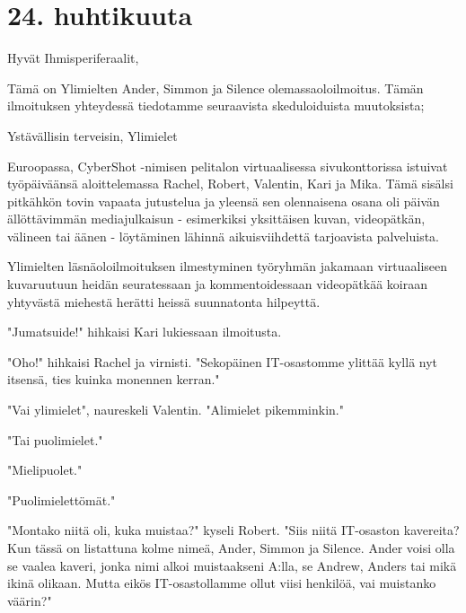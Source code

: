 \chapter{24. huhtikuuta}Hyvät Ihmisperiferaalit,


Tämä on Ylimielten Ander, Simmon ja Silence olemassaoloilmoitus. Tämän ilmoituksen yhteydessä tiedotamme seuraavista skeduloiduista muutoksista;




Ystävällisin terveisin, Ylimielet




\psep Euroopassa, CyberShot -nimisen pelitalon virtuaalisessa sivukonttorissa istuivat työpäiväänsä aloittelemassa Rachel, Robert, Valentin, Kari ja Mika. Tämä sisälsi pitkähkön tovin vapaata jutustelua ja yleensä sen olennaisena osana oli päivän ällöttävimmän mediajulkaisun - esimerkiksi yksittäisen kuvan, videopätkän, välineen tai äänen - löytäminen lähinnä aikuisviihdettä tarjoavista palveluista.


Ylimielten läsnäoloilmoituksen ilmestyminen työryhmän jakamaan virtuaaliseen kuvaruutuun heidän seuratessaan ja kommentoidessaan videopätkää koiraan yhtyvästä miehestä herätti heissä suunnatonta hilpeyttä.


"Jumatsuide!" hihkaisi Kari lukiessaan ilmoitusta.


"Oho!" hihkaisi Rachel ja virnisti. "Sekopäinen IT-osastomme ylittää kyllä nyt itsensä, ties kuinka monennen kerran."


"Vai ylimielet", naureskeli Valentin. "Alimielet pikemminkin."


"Tai puolimielet."


"Mielipuolet."


"Puolimielettömät."


"Montako niitä oli, kuka muistaa?" kyseli Robert. "Siis niitä IT-osaston kavereita? Kun tässä on listattuna kolme nimeä, Ander, Simmon ja Silence. Ander voisi olla se vaalea kaveri, jonka nimi alkoi muistaakseni A:lla, se Andrew, Anders tai mikä ikinä olikaan. Mutta eikös IT-osastollamme ollut viisi henkilöä, vai muistanko väärin?"


